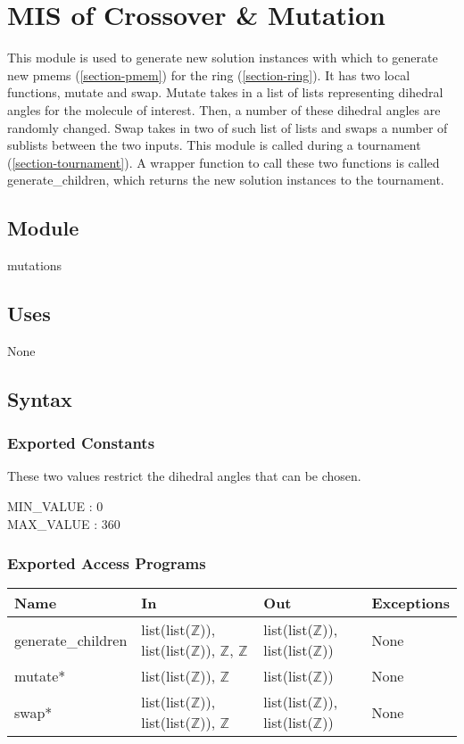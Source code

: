 \documentclass[12pt, titlepage]{article}
\begin{document}
\section{MIS of Crossover \& Mutation} \label{section-mutations}

This module is used to generate new solution instances with which to generate 
new pmems (\ref{section-pmem}) for the ring (\ref{section-ring}). It has two 
local functions, mutate and swap. Mutate takes in a list of lists representing 
dihedral angles for the molecule of interest. Then, a number of these dihedral 
angles are randomly changed. Swap takes in two of such list of lists and swaps 
a number of sublists between the two inputs. This module is called during a 
tournament (\ref{section-tournament}). A wrapper function to call these two 
functions is called generate\_children, which returns the new solution 
instances to the tournament.

\subsection{Module}

mutations

\subsection{Uses}

None

\subsection{Syntax}

\subsubsection{Exported Constants}

These two values restrict the dihedral angles that can be chosen.

MIN\_VALUE : 0\\
\indent MAX\_VALUE : 360

\subsubsection{Exported Access Programs}

\begin{center}
	\begin{tabular}{p{3.5cm} p{4cm} p{3cm} p{2cm}}
		\hline
		\textbf{Name} & \textbf{In} & \textbf{Out} & \textbf{Exceptions} \\
		\hline
		generate\_children & list(list($\mathbb{Z}$)), 
		list(list($\mathbb{Z}$)), $\mathbb{Z}$, $\mathbb{Z}$ & 
		list(list($\mathbb{Z}$)), list(list($\mathbb{Z}$)) & None \\
		mutate* & list(list($\mathbb{Z}$)), $\mathbb{Z}$ & 
		list(list($\mathbb{Z}$)) & None \\
		swap* & list(list($\mathbb{Z}$)), 
		list(list($\mathbb{Z}$)), $\mathbb{Z}$ & list(list($\mathbb{Z}$)), 
		list(list($\mathbb{Z}$)) & None \\
		\hline
	\end{tabular}
\end{center}
\end{document}
